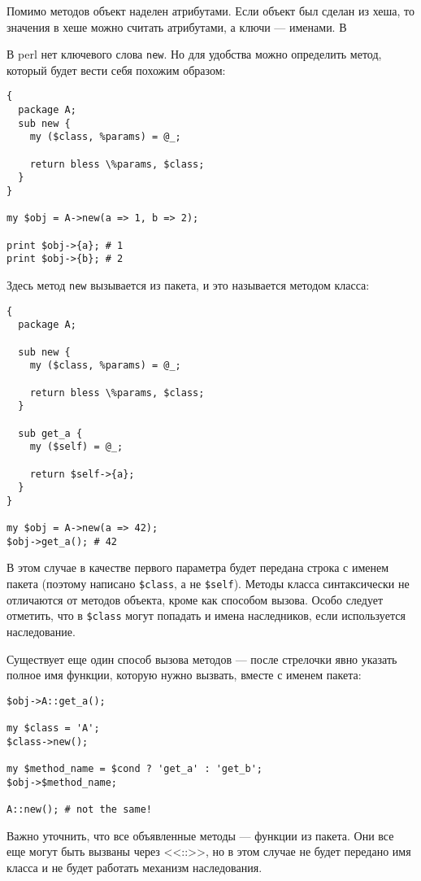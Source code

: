 Помимо методов объект наделен атрибутами. Если объект был сделан из хеша, то значения в хеше можно считать атрибутами, а ключи --- именами. В

В perl нет ключевого слова \verb|new|. Но для удобства можно определить метод, который будет вести себя похожим образом:
\begin{verbatim}
{
  package A;
  sub new {
    my ($class, %params) = @_;

    return bless \%params, $class;
  }
}

my $obj = A->new(a => 1, b => 2);

print $obj->{a}; # 1
print $obj->{b}; # 2
\end{verbatim}
Здесь метод \verb|new| вызывается из пакета, и это называется методом класса:
\begin{verbatim}
{
  package A;

  sub new {
    my ($class, %params) = @_;

    return bless \%params, $class;
  }

  sub get_a {
    my ($self) = @_;

    return $self->{a};
  }
}

my $obj = A->new(a => 42);
$obj->get_a(); # 42
\end{verbatim}
В этом случае в качестве первого параметра будет передана строка с именем пакета (поэтому написано \verb|$class|, а не \verb|$self|). Методы класса синтаксически не отличаются от методов объекта, кроме как способом вызова. Особо следует отметить, что в \verb|$class| могут попадать и имена наследников, если используется наследование.

Существует еще один способ вызова методов --- после стрелочки явно указать полное имя функции, которую нужно вызвать, вместе с именем пакета:
\begin{verbatim}
$obj->A::get_a();

my $class = 'A';
$class->new();

my $method_name = $cond ? 'get_a' : 'get_b';
$obj->$method_name;

A::new(); # not the same!
\end{verbatim}
Важно уточнить, что все объявленные методы --- функции из пакета. Они все еще могут быть вызваны через <<::>>, но в этом случае не будет передано имя класса и не будет работать механизм наследования.

